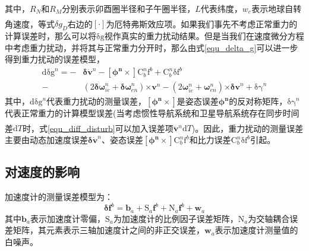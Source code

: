 \documentclass[12pt,a4,utf8]{article}
\newcommand{\upcite}[1]{\textsuperscript{\textsuperscript{\cite{#1}}}} %
\newcommand{\bmmathrm}[1]{\bm{\mathrm{#1}}}
\begin{document}
其中，$R_N$和$R_M$分别表示卯酉圈半径和子午圈半径，$L$代表纬度，$w_{e}$表示地球自转角速度，等式$\delta g_D$右边的$\left[ \cdot  \right]$为厄特弗斯效应项\upcite{harlan1968eotvos}。如果我们事先不考虑正常重力的计算误差时，那么可以将$\bmmathrm{\delta g}$视作真实的重力扰动结果。但是当我们在速度微分方程中考虑重力扰动，并将其与正常重力分开时，那么由式\ref{equ_delta_g}可以进一步得到重力扰动的误差模型，
\begin{equation}
      \begin{aligned}
      \text{d}\bmmathrm{\delta g}^n = -&\bm{\delta} \dot{\bm{v}}^n - \bm{[\phi^n\times]}\bmmathrm{C}^n_b \bmmathrm{f}^b + \bmmathrm{C}^n_b \bmmathrm{\delta f}^b  
      \\
      -&(2\bm{\delta \omega}^n_{ie} + \bm{\delta \omega}^n_{en})\bm{\times v}^n - (2\bm{\omega}^n_{ie} + \bm{\omega}^n_{en})\bm{\times \delta v}^n + \bmmathrm{\delta \gamma}^n
      \end{aligned}
      \label{equ_diff_disturb}
\end{equation}
其中，$\text{d}\bmmathrm{\delta g}^n$代表重力扰动的测量误差，$\bm{[\phi^n \times]}$是姿态误差$\bm{\phi^n}$的反对称矩阵，$\bmmathrm{\delta \gamma}^n$代表正常重力的计算模型误差(当考虑惯性导航系统和卫星导航系统存在同步时间差$\text{d}T$时\upcite{schwarz1995some}，式\ref{equ_diff_disturb}可以加入误差项$\ddot{\bm{v}}^n\text{d}T$)。因此，重力扰动的测量误差主要由动态加速度误差$\bm{\delta} \dot{\bm{v}}^n$、姿态误差$\bm{[\phi^n\times]}\bmmathrm{C}^n_b \bmmathrm{f}^b$和比力误差$\bmmathrm{C}^n_b \bmmathrm{\delta f}^b$引起。

\subsection{对速度的影响}
加速度计的测量误差模型为：
\begin{equation}
      \bm{\delta f}^b = \bm{b}_a + \bmmathrm{S}_a \bm{f}^b + \bmmathrm{N}_a \bm{f}^b + \bm{w}_a
      \label{acc_bias}
\end{equation}
其中$\bm{b}_a$表示加速度计零偏，$\bmmathrm{S}_a$为加速度计的比例因子误差矩阵，$\bmmathrm{N}_a$为交轴耦合误差矩阵，其元素表示三轴加速度计之间的非正交误差，$\bm{w}_a$表示加速度计测量值的白噪声。
\end{document}
